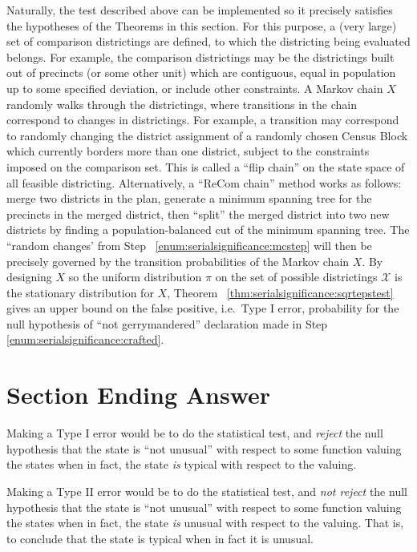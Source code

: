 \documentclass[12pt]{article}
\begin{document}
Naturally, the test described above can be implemented so it precisely
satisfies the hypotheses of the Theorems in this section.  For this
purpose, a (very large) set of comparison districtings are defined, to
which the districting being evaluated belongs.  For example, the
comparison districtings may be the districtings built out of precincts (or
some other unit) which are contiguous, equal in population up to some
specified deviation, or include other constraints.  A Markov chain \( X \)
randomly walks through the districtings, where transitions in the chain
correspond to changes in districtings.  For example, a transition may
correspond to randomly changing the district assignment of a randomly
chosen Census Block which currently borders more than one district,
subject to the constraints imposed on the comparison set.  This is
called a ``flip chain'' on the state space of all feasible districting.
Alternatively, a ``ReCom chain'' method works as follows:  merge two
districts in the plan, generate a minimum spanning tree for the
precincts in the merged district, then ``split'' the merged district
into two new districts by finding a population-balanced cut of the
minimum spanning tree.  The ``random changes' from Step~%
\ref{enum:serialsignificance:mcstep} will then be precisely governed by
the transition probabilities of the Markov chain \( X \).  By designing \(
X \) so the uniform distribution \( \pi \) on the set of possible
districtings \( \mathcal{X} \) is the stationary distribution for \( X \),
Theorem~%
\ref{thm:serialsignificance:sqrtepstest} gives an upper bound on the
false positive, i.e.\ Type I error, probability for the null hypothesis
of ``not gerrymandered'' declaration made in Step~%
\ref{enum:serialsignificance:crafted}.

\section*{Section Ending Answer}

Making a Type I error would be to do the statistical test, and \emph{reject}
the null hypothesis that the state is ``not unusual'' with respect to
some function valuing the states when in fact, the state \emph{is}
typical with respect to the valuing.

Making a Type II error would be to do the statistical test, and \emph{not
reject} the null hypothesis that the state is ``not unusual'' with
respect to some function valuing the states when in fact, the state
\emph{is} unusual with respect to the valuing.  That is, to conclude
that the state is typical when in fact it is unusual.
\end{document}

